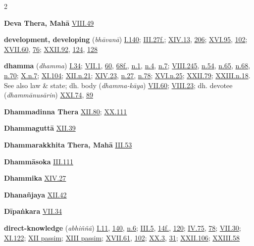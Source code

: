 \begin{multicols}{2}
\begin{vismHanging}
\par\textbf{Deva Thera, Mahā} \hyperlink{VIII.49}{VIII.49}{}
\par\textbf{development, developing} (\emph{bhāvanā}) \hyperlink{I.140}{I.140}{}; \hyperlink{III.27}{III.27f.}{}; \hyperlink{XIV.13}{XIV.13}{}, \hyperlink{XIV.206}{206}{}; \hyperlink{XVI.95}{XVI.95}{}, \hyperlink{XVI.102}{102}{}; \hyperlink{XVII.60}{XVII.60}{}, \hyperlink{XVII.76}{76}{}; \hyperlink{XXII.92}{XXII.92}{}, \hyperlink{XXII.124}{124}{}, \hyperlink{XXII.128}{128}{}
\par\textbf{dhamma} (\emph{dhamma}) \hyperlink{I.34}{I.34}{}; \hyperlink{VII.1}{VII.1}{}, \hyperlink{VII.60}{60}{}, \hyperlink{VII.68}{68f.}{}, \hyperlink{VII.n1}{n.1}{}, \hyperlink{VII.n4}{n.4}{}, \hyperlink{VII.n7}{n.7}{}; \hyperlink{VIII.245}{VIII.245}{}, \hyperlink{VIII.n54}{n.54}{}, \hyperlink{VIII.n65}{n.65}{}, \hyperlink{VIII.n68}{n.68}{}, \hyperlink{VIII.n70}{n.70}{}; \hyperlink{X.n7}{X.n.7}{}; \hyperlink{XI.104}{XI.104}{}; \hyperlink{XII.n21}{XII.n.21}{}; \hyperlink{XIV.23}{XIV.23}{}, \hyperlink{XIV.n27}{n.27}{}, \hyperlink{XIV.n78}{n.78}{}; \hyperlink{XVI.n25}{XVI.n.25}{}; \hyperlink{XXII.79}{XXII.79}{}; \hyperlink{XXIII.n18}{XXIII.n.18}{}. See also law \& state; dh. body (\emph{dhamma-kāya}) \hyperlink{VII.60}{VII.60}{}; \hyperlink{VIII.23}{VIII.23}{}; dh. devotee (\emph{dhammānusārin}) \hyperlink{XXI.74}{XXI.74}{}, \hyperlink{XXI.89}{89}{}
\par\textbf{Dhammadinna Thera} \hyperlink{XII.80}{XII.80}{}; \hyperlink{XX.111}{XX.111}{}
\par\textbf{Dhammaguttā} \hyperlink{XII.39}{XII.39}{}
\par\textbf{Dhammarakkhita Thera, Mahā} \hyperlink{III.53}{III.53}{}
\par\textbf{Dhammāsoka} \hyperlink{III.111}{III.111}{}
\par\textbf{Dhammika} \hyperlink{XIV.27}{XIV.27}{}
\par\textbf{Dhanañjaya} \hyperlink{XII.42}{XII.42}{}
\par\textbf{Dīpaṅkara} \hyperlink{VII.34}{VII.34}{}
\par\textbf{direct-knowledge} (\emph{abhiññā}) \hyperlink{I.11}{I.11}{}, \hyperlink{I.140}{140}{}, \hyperlink{I.n6}{n.6}{}; \hyperlink{III.5}{III.5}{}, \hyperlink{III.14}{14f.}{}, \hyperlink{III.120}{120}{}; \hyperlink{IV.75}{IV.75}{}, \hyperlink{IV.78}{78}{}; \hyperlink{VII.30}{VII.30}{}; \hyperlink{XI.122}{XI.122}{}; \hyperlink{XII}{XII passim}{}; \hyperlink{XIII}{XIII passim}{}; \hyperlink{XVII.61}{XVII.61}{}, \hyperlink{XVII.102}{102}{}; \hyperlink{XX.3}{XX.3}{}, \hyperlink{XX.31}{31}{}; \hyperlink{XXII.106}{XXII.106}{}; \hyperlink{XXIII.58}{XXIII.58}{}

\end{vismHanging}
\end{multicols}
